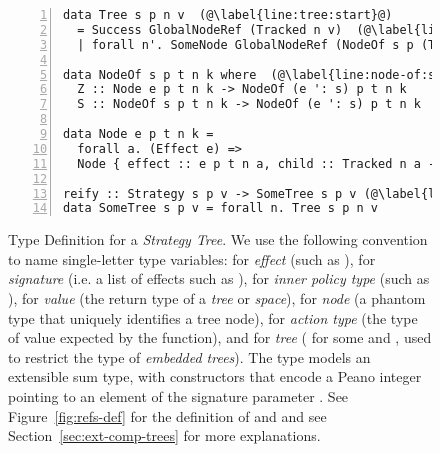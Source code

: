 \begin{figure}[t]
\begin{lncodebox}
\hspace{17pt}
\begin{lstlisting}[style=haskell,numbers=left,numbersep=12pt]
data Tree s p n v  (@\label{line:tree:start}@)
  = Success GlobalNodeRef (Tracked n v)  (@\label{line:success}@)
  | forall n'. SomeNode GlobalNodeRef (NodeOf s p (Tree s p) n' (Tree s p n v))  (@\label{line:some-node}\label{line:tree:end}@)

data NodeOf s p t n k where  (@\label{line:node-of:start}@)
  Z :: Node e p t n k -> NodeOf (e ': s) p t n k
  S :: NodeOf s p t n k -> NodeOf (e ': s) p t n k  (@\label{line:node-of:end}@)

data Node e p t n k =
  forall a. (Effect e) =>
  Node { effect :: e p t n a, child :: Tracked n a -> k }

reify :: Strategy s p v -> SomeTree s p v (@\label{line:make-tree}@)
data SomeTree s p v = forall n. Tree s p n v
\end{lstlisting}
\end{lncodebox}
\vspace{-0.2cm}
\caption{Type Definition for a \emph{Strategy Tree}. We use the following convention to name single-letter type variables:  for \emph{effect} (such as ),  for \emph{signature} (i.e. a list of effects such as ),  for \emph{inner policy type} (such as ),  for \emph{value} (the return type of a \emph{tree} or \emph{space}),  for \emph{node} (a phantom type that uniquely identifies a tree node),  for \emph{action type} (the type of value expected by the  function), and  for \emph{tree} ( for some  and , used to restrict the type of \emph{embedded trees}). The  type models an extensible sum type, with constructors that encode a Peano integer pointing to an element of the signature parameter . See Figure~\ref{fig:refs-def} for the definition of  and  and see Section~\ref{sec:ext-comp-trees} for more explanations. }\label{fig:tree-def}
\end{figure}
